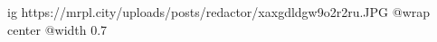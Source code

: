  
 
 
 
 

\ifcmt
  ig https://mrpl.city/uploads/posts/redactor/xaxgdldgw9o2r2ru.JPG
  @wrap center
  @width 0.7
\fi
